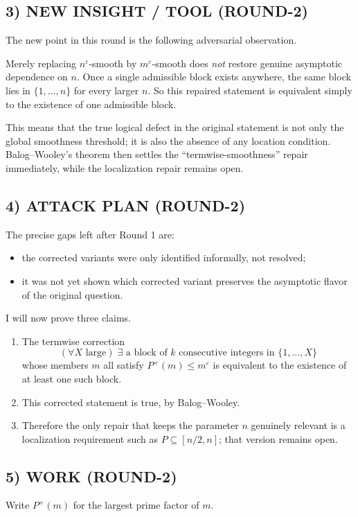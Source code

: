 \subsection*{3) NEW INSIGHT / TOOL (ROUND-2)}
The new point in this round is the following adversarial observation.

Merely replacing $n^{\varepsilon}$-smooth by $m^{\varepsilon}$-smooth does \emph{not} restore genuine asymptotic dependence on $n$. Once a single admissible block exists anywhere, the same block lies in $\{1,\ldots,n\}$ for every larger $n$. So this repaired statement is equivalent simply to the existence of one admissible block.

This means that the true logical defect in the original statement is not only the global smoothness threshold; it is also the absence of any location condition. Balog--Wooley's theorem then settles the ``termwise-smoothness'' repair immediately, while the localization repair remains open.

\subsection*{4) ATTACK PLAN (ROUND-2)}
The precise gaps left after Round 1 are:
\begin{itemize}
\item the corrected variants were only identified informally, not resolved;
\item it was not yet shown which corrected variant preserves the asymptotic flavor of the original question.
\end{itemize}

I will now prove three claims.
\begin{enumerate}
\item The termwise correction
\[
(\forall X \text{ large})\; \exists \text{ a block of $k$ consecutive integers in } \{1,\ldots,X\}
\]
whose members $m$ all satisfy $P^{+}(m)\leq m^{\varepsilon}$ is equivalent to the existence of at least one such block.
\item This corrected statement is true, by Balog--Wooley.
\item Therefore the only repair that keeps the parameter $n$ genuinely relevant is a localization requirement such as $P\subseteq [n/2,n]$; that version remains open.
\end{enumerate}

\subsection*{5) WORK (ROUND-2)}
Write $P^{+}(m)$ for the largest prime factor of $m$.

